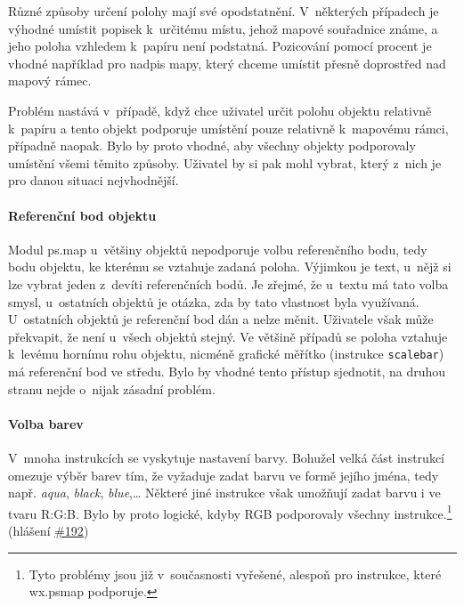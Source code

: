 \documentclass[a4paper,12pt,draft]{article}
\newcommand{\instr}[1]{\lstinline[style=psmapInline]|#1|}
\begin{document}
Různé způsoby určení polohy mají své opodstatnění. V~některých
případech je výhodné umístit popisek k~určitému místu, jehož
mapové souřadnice známe, a jeho poloha vzhledem k~papíru není
podstatná. Pozicování pomocí procent je vhodné například pro nadpis
mapy, který chceme umístit přesně doprostřed nad mapový rámec.

Problém nastává v~případě, když chce uživatel určit polohu objektu
relativně k~papíru a tento objekt podporuje umístění pouze relativně
k~mapovému rámci, případně naopak. Bylo by proto vhodné, aby všechny
objekty podporovaly umístění všemi těmito způsoby. Uživatel by si
pak mohl vybrat, který z~nich je pro danou situaci nejvhodnější.


\paragraph*{Referenční bod objektu}
\label{sec:psmap:referencepoint}
Modul ps.map u~většiny objektů nepodporuje volbu referenčního
bodu, tedy bodu objektu, ke kterému se vztahuje zadaná poloha. Výjim\-kou
je text, u~nějž si lze vybrat jeden z~devíti referenčních bodů. Je
zřejmé, že u~textu má tato volba smysl, u~ostatních objektů je otázka,
zda by tato vlastnost byla využívaná.
U~ostatních objektů je referenční bod dán a nelze měnit. Uživatele
však může překvapit, že není u~všech objektů stejný. Ve většině
případů se poloha vztahuje k~levému hornímu rohu objektu, nicméně
grafické měřítko (instrukce \instr{scalebar}) má referenční bod ve
středu. Bylo by vhodné tento přístup sjednotit, na druhou stranu nejde
o~nijak zásadní problém.


\paragraph*{Volba barev}
\label{sec:psmap:color}
V~mnoha instrukcích se vyskytuje nastavení barvy. Bohužel velká část
instrukcí omezuje výběr barev tím, že vyžaduje zadat barvu ve formě
jejího jména, tedy např. \emph{aqua}, \emph{black}, \emph{blue},\ldots 
Některé jiné instrukce však umožňují zadat barvu i ve tvaru R:G:B. Bylo
by proto logické, kdyby RGB podporovaly všechny instrukce.\footnote{Tyto
problémy jsou již v~současnosti vyřešené, alespoň pro instrukce,
které wx.psmap podporuje.}
(hlášení \href{https://trac.osgeo.org/grass/ticket/192}{\#192})
\end{document}
